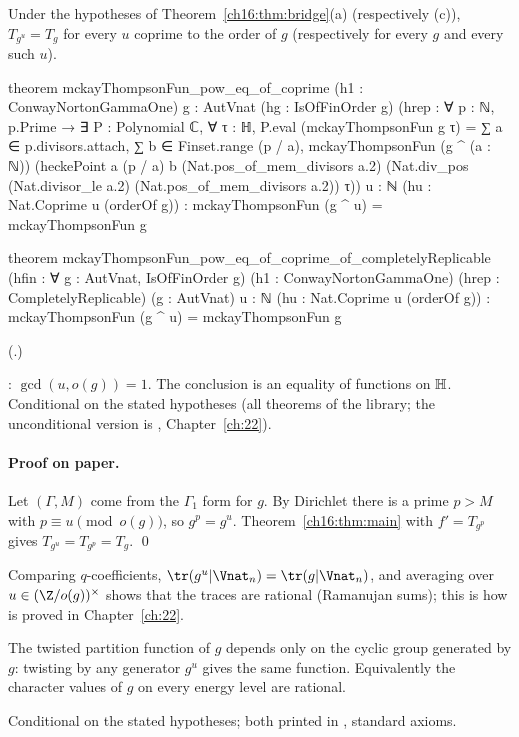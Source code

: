 \begin{theorem}\label{ch16:thm:galois}
Under the hypotheses of Theorem~\ref{ch16:thm:bridge}(a) (respectively (c)), $T_{g^u}=T_g$ for every $u$ coprime to the
order of $g$ (respectively for every $g$ and every such $u$).
\end{theorem}
\begin{leancode}
theorem mckayThompsonFun_pow_eq_of_coprime (h1 : ConwayNortonGammaOne) {g : AutVnat}
    (hg : IsOfFinOrder g)
    (hrep : ∀ p : ℕ, p.Prime → ∃ P : Polynomial ℂ, ∀ τ : ℍ, P.eval (mckayThompsonFun g τ) =
      ∑ a ∈ p.divisors.attach, ∑ b ∈ Finset.range (p / a),
        mckayThompsonFun (g ^ (a : ℕ)) (heckePoint a (p / a) b (Nat.pos_of_mem_divisors a.2)
          (Nat.div_pos (Nat.divisor_le a.2) (Nat.pos_of_mem_divisors a.2)) τ))
    {u : ℕ} (hu : Nat.Coprime u (orderOf g)) :
    mckayThompsonFun (g ^ u) = mckayThompsonFun g

theorem mckayThompsonFun_pow_eq_of_coprime_of_completelyReplicable
    (hfin : ∀ g : AutVnat, IsOfFinOrder g) (h1 : ConwayNortonGammaOne)
    (hrep : CompletelyReplicable) (g : AutVnat) {u : ℕ} (hu : Nat.Coprime u (orderOf g)) :
    mckayThompsonFun (g ^ u) = mckayThompsonFun g
\end{leancode}
(.)
\begin{dictionary}
: $\gcd(u,o(g))=1$.  The conclusion is an equality of functions on $\mathbb{H}$.
Conditional on the stated hypotheses (all theorems of the library; the unconditional version is
, Chapter~\ref{ch:22}).
\end{dictionary}
\paragraph{Proof on paper.}  Let $(\Gamma,M)$ come from the $\Gamma_1$ form for $g$.  By Dirichlet there is a prime
$p>M$ with $p\equiv u\pmod{o(g)}$, so $g^p=g^u$.  Theorem~\ref{ch16:thm:main} with $f'=T_{g^p}$ gives
$T_{g^u}=T_{g^p}=T_g$. \qed

Comparing $q$-coefficients, $\tr(g^u|\Vnat_n)=\tr(g|\Vnat_n)$, and averaging over $u\in(\Z/o(g))^\times$ shows that the
traces are rational (Ramanujan sums); this is how  is proved in Chapter~\ref{ch:22}.
\begin{physics}
The twisted partition function of $g$ depends only on the cyclic group generated by $g$: twisting by any generator
$g^u$ gives the same function.  Equivalently the character values of $g$ on every energy level are rational.
\end{physics}
\begin{status}
Conditional on the stated hypotheses; both printed in ,
standard axioms.
\end{status}


